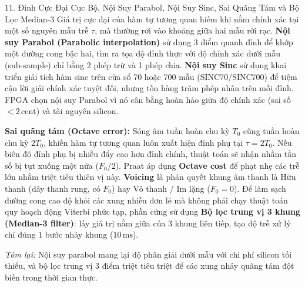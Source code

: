 \begin{feynmanbox}{11. Đỉnh Cực Đại Cục Bộ, Nội Suy Parabol, Nội Suy Sinc, Sai Quãng Tám và Bộ Lọc Median-3}
Giá trị cực đại của hàm tự tương quan hiếm khi nằm chính xác tại một số nguyên mẫu trễ $\tau$, mà thường rơi vào khoảng giữa hai mẫu rời rạc. \textbf{Nội suy Parabol (Parabolic interpolation)} sử dụng 3 điểm quanh đỉnh để khớp một đường cong bậc hai, tìm ra tọa độ đỉnh thực với độ chính xác dưới mẫu (sub-sample) chỉ bằng 2 phép trừ và 1 phép chia. \textbf{Nội suy Sinc} sử dụng khai triển giải tích hàm sinc trên cửa sổ 70 hoặc 700 mẫu (SINC70/SINC700) để tiệm cận lời giải chính xác tuyệt đối, nhưng tốn hàng trăm phép nhân trên mỗi đỉnh. FPGA chọn nội suy Parabol vì nó cân bằng hoàn hảo giữa độ chính xác (sai số $< 2\,\text{cent}$) và tài nguyên silicon.

\textbf{Sai quãng tám (Octave error):} Sóng âm tuần hoàn chu kỳ $T_0$ cũng tuần hoàn chu kỳ $2T_0$, khiến hàm tự tương quan luôn xuất hiện đỉnh phụ tại $\tau = 2T_0$. Nếu biên độ đỉnh phụ bị nhiễu đẩy cao hơn đỉnh chính, thuật toán sẽ nhận nhầm tần số bị tụt xuống một nửa ($F_0/2$). Praat áp dụng \textbf{Octave cost} để phạt nhẹ các trễ lớn nhằm triệt tiêu thiên vị này. \textbf{Voicing} là phán quyết khung âm thanh là Hữu thanh (dây thanh rung, có $F_0$) hay Vô thanh / Im lặng ($F_0 = 0$). Để làm sạch đường cong cao độ khỏi các xung nhiễu đơn lẻ mà không phải chạy thuật toán quy hoạch động Viterbi phức tạp, phần cứng sử dụng \textbf{Bộ lọc trung vị 3 khung (Median-3 filter)}: lấy giá trị nằm giữa của 3 khung liên tiếp, tạo độ trễ xử lý chỉ đúng $1$ bước nhảy khung ($10\,\text{ms}$).

\emph{Tóm lại:} Nội suy parabol mang lại độ phân giải dưới mẫu với chi phí silicon tối thiểu, và bộ lọc trung vị 3 điểm triệt tiêu triệt để các xung nhảy quãng tám đột biến trong thời gian thực.
\end{feynmanbox}

